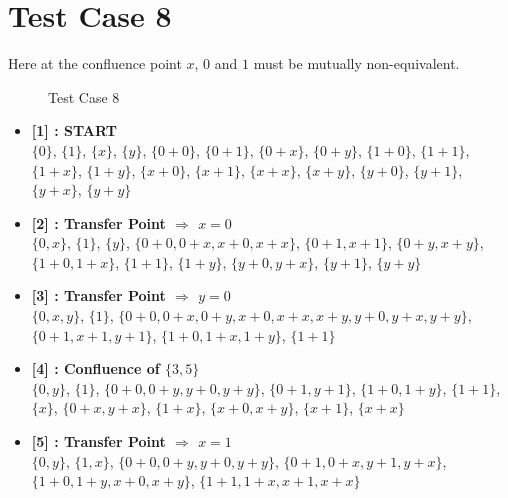 \section{Test Case 8}
\label{sec:tc8}
Here at the confluence point $x$, $0$ and $1$ must be mutually non-equivalent.

\begin{figure}[H]
\label{fig:tc8}
    \caption{Test Case 8}
\end{figure}

\begin{itemize}

    \item \textbf{[1] : START}\\
        $\{0\}$, $\{1\}$, $\{x\}$, $\{y\}$, $\{0 + 0\}$, $\{0 + 1\}$, $\{0 + x\}$, $\{0 + y\}$, $\{1 + 0\}$, $\{1 + 1\}$, $\{1 + x\}$, $\{1 + y\}$, $\{x + 0\}$, $\{x + 1\}$, $\{x + x\}$, $\{x + y\}$, $\{y + 0\}$, $\{y + 1\}$, $\{y + x\}$, $\{y + y\}$

    \item \textbf{[2] : Transfer Point $\Rightarrow$ $x = 0$}\\
        $\{0, x\}$, $\{1\}$, $\{y\}$, $\{0 + 0, 0 + x, x + 0, x + x\}$, $\{0 + 1, x + 1\}$, $\{0 + y, x + y\}$, $\{1 + 0, 1 + x\}$, $\{1 + 1\}$, $\{1 + y\}$, $\{y + 0, y + x\}$, $\{y + 1\}$, $\{y + y\}$

    \item \textbf{[3] : Transfer Point $\Rightarrow$ $y = 0$}\\
        $\{0, x, y\}$, $\{1\}$, $\{0 + 0, 0 + x, 0 + y, x + 0, x + x, x + y, y + 0, y + x, y + y\}$, $\{0 + 1, x + 1, y + 1\}$, $\{1 + 0, 1 + x, 1 + y\}$, $\{1 + 1\}$

    \item \textbf{[4] : Confluence of $\{3, 5\}$}\\
        $\{0, y\}$, $\{1\}$, $\{0 + 0, 0 + y, y + 0, y + y\}$, $\{0 + 1, y + 1\}$, $\{1 + 0, 1 + y\}$, $\{1 + 1\}$, $\{x\}$, $\{0 + x, y + x\}$, $\{1 + x\}$, $\{x + 0, x + y\}$, $\{x + 1\}$, $\{x + x\}$

    \item \textbf{[5] : Transfer Point $\Rightarrow$ $x = 1$}\\
        $\{0, y\}$, $\{1, x\}$, $\{0 + 0, 0 + y, y + 0, y + y\}$, $\{0 + 1, 0 + x, y + 1, y + x\}$, $\{1 + 0, 1 + y, x + 0, x + y\}$, $\{1 + 1, 1 + x, x + 1, x + x\}$

\end{itemize}

